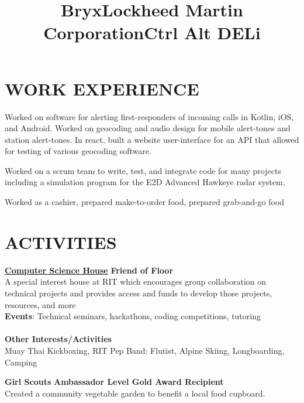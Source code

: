\documentclass[line,margin]{res}
\begin{document}
\begin{resume}
\section{WORK EXPERIENCE}
\title{\textbf{Bryx}}
\begin{position}
    Worked on software for alerting first-responders of incoming calls in Kotlin, iOS, and Android. Worked on geocoding and audio design for mobile alert-tones and station alert-tones. In react, built a website user-interface for an API that allowed for testing of various geocoding software.
\end{position}
\title{\textbf{Lockheed Martin Corporation}}
\begin{position}
    Worked on a scrum team to write, test, and integrate code for many projects including a simulation program for the E2D Advanced Hawkeye radar system.
\end{position}
\title{\textbf{Ctrl Alt DELi}}
\begin{position}
    Worked as a cashier, prepared make-to-order food, prepared grab-and-go food
\end{position}

\section{ACTIVITIES}
\href{https://csh.rit.edu}{\textbf{Computer Science House}}
\hfill
\textbf{Friend of Floor}\\
A special interest house at RIT which encourages group collaboration on technical 
projects and provides access and funds to develop those projects, resources, and more\\
\textbf{Events}: 
Technical seminars, hackathons, coding competitions, tutoring\\
\\\textbf{Other Interests/Activities}\\
Muay Thai Kickboxing, RIT Pep Band: Flutist, Alpine Skiing, Longboarding, Camping

\textbf{Girl Scouts} \hfill \textbf{Ambassador Level Gold Award Recipient}\\
Created a community vegetable garden to benefit a local food cupboard.

\end{resume}
\end{document}
